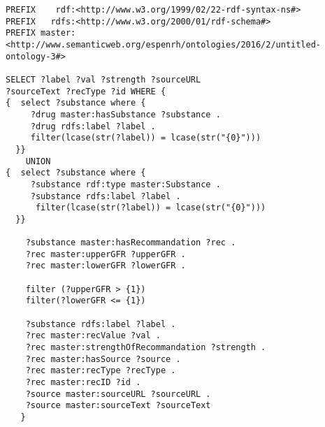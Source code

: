 
\begin{lstlisting}[captionpos=b, caption=SPARQL query, label=lst:sparql,
   basicstyle=\tiny,frame=single]
PREFIX    rdf:<http://www.w3.org/1999/02/22-rdf-syntax-ns#>
PREFIX   rdfs:<http://www.w3.org/2000/01/rdf-schema#>
PREFIX master:<http://www.semanticweb.org/espenrh/ontologies/2016/2/untitled-ontology-3#>

SELECT ?label ?val ?strength ?sourceURL 
?sourceText ?recType ?id WHERE {  
{  select ?substance where {
     ?drug master:hasSubstance ?substance . 
     ?drug rdfs:label ?label . 
     filter(lcase(str(?label)) = lcase(str("{0}")))
  }}
    UNION 
{  select ?substance where {
     ?substance rdf:type master:Substance .
     ?substance rdfs:label ?label .
      filter(lcase(str(?label)) = lcase(str("{0}")))
  }}
  
    ?substance master:hasRecommandation ?rec .
    ?rec master:upperGFR ?upperGFR .
    ?rec master:lowerGFR ?lowerGFR .

    filter (?upperGFR > {1})                       
    filter(?lowerGFR <= {1}) 

    ?substance rdfs:label ?label .
    ?rec master:recValue ?val .
    ?rec master:strengthOfRecommandation ?strength .
    ?rec master:hasSource ?source .
    ?rec master:recType ?recType .
    ?rec master:recID ?id .
    ?source master:sourceURL ?sourceURL .
    ?source master:sourceText ?sourceText 
   }
\end{lstlisting}
